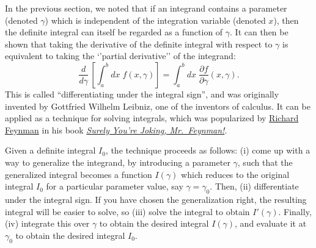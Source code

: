\documentclass[10pt,a4paper]{article}
\begin{document}
In the previous section, we noted that if an integrand contains a
parameter (denoted $\gamma$) which is independent of the integration
variable (denoted $x$), then the definite integral can itself be
regarded as a function of $\gamma$. It can then be shown that taking
the derivative of the definite integral with respect to $\gamma$ is
equivalent to taking the `'partial derivative'' of the integrand:
\begin{equation}
  \frac{d}{d\gamma} \, \left[\int_a^b dx\; f(x,\gamma)\right] = \int_a^b dx \; \frac{\partial f}{\partial \gamma}(x,\gamma).
\end{equation}
This is called ``differentiating under the integral sign'', and was
originally invented by Gottfried Wilhelm Leibniz, one of the inventors
of calculus. It can be applied as a technique for solving integrals,
which was popularized by
\href{https://en.wikipedia.org/wiki/Richard_Feynman}{Richard Feynman}
in his book
\href{https://en.wikipedia.org/wiki/Surely_You\%27re_Joking,_Mr._Feynman!}{\emph{Surely You're Joking, Mr.~Feynman!}}.

Given a definite integral $I_0$, the technique proceeds as follows:
(i) come up with a way to generalize the integrand, by introducing a
parameter $\gamma$, such that the generalized integral becomes a
function $I(\gamma)$ which reduces to the original integral $I_0$ for
a particular parameter value, say $\gamma = \gamma_0$. Then, (ii)
differentiate under the integral sign. If you have chosen the
generalization right, the resulting integral will be easier to solve,
so (iii) solve the integral to obtain $I'(\gamma)$. Finally, (iv)
integrate this over $\gamma$ to obtain the desired integral
$I(\gamma)$, and evaluate it at $\gamma_0$ to obtain the desired
integral $I_0$.
\end{document}

